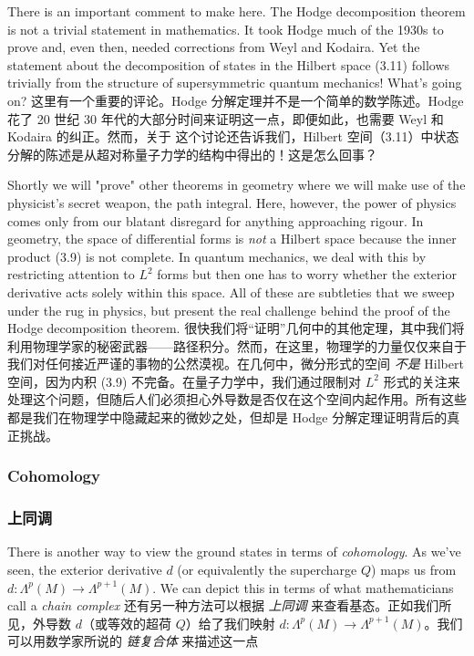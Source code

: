 \documentclass{article}
\begin{document}
\begin{paracol}{2}
There is an important comment to make here. The Hodge decomposition theorem is not a trivial statement in mathematics. It took Hodge much of the 1930s to prove and, even then, needed corrections from Weyl and Kodaira. Yet the statement about the decomposition of states in the Hilbert space (3.11) follows trivially from the structure of supersymmetric quantum mechanics! What’s going on?
\switchcolumn
这里有一个重要的评论。Hodge 分解定理并不是一个简单的数学陈述。Hodge 花了 20 世纪 30 年代的大部分时间来证明这一点，即便如此，也需要 Weyl 和 Kodaira 的纠正。然而，关于 这个讨论还告诉我们，Hilbert 空间（3.11）中状态分解的陈述是从超对称量子力学的结构中得出的！这是怎么回事？
\switchcolumn*

Shortly we will "prove" other theorems in geometry where we will make use of the physicist’s secret weapon, the path integral. Here, however, the power of physics comes only from our blatant disregard for anything approaching rigour. In geometry, the space of differential forms is \textit{not} a Hilbert space because the inner product (3.9) is not complete. In quantum mechanics, we deal with this by restricting attention to $L^2$ forms but then one has to worry whether the exterior derivative acts solely within this space. All of these are subtleties that we sweep under the rug in physics, but present the real challenge behind the proof of the Hodge decomposition theorem.
\switchcolumn
很快我们将“证明”几何中的其他定理，其中我们将利用物理学家的秘密武器——路径积分。然而，在这里，物理学的力量仅仅来自于我们对任何接近严谨的事物的公然漠视。在几何中，微分形式的空间 \textit{不是} Hilbert 空间，因为内积 (3.9) 不完备。在量子力学中，我们通过限制对 $L^2$ 形式的关注来处理这个问题，但随后人们必须担心外导数是否仅在这个空间内起作用。所有这些都是我们在物理学中隐藏起来的微妙之处，但却是 Hodge 分解定理证明背后的真正挑战。
\switchcolumn*

\subsubsection*{Cohomology}
\switchcolumn
\subsubsection*{上同调}
\switchcolumn*

There is another way to view the ground states in terms of \textit{cohomology}. As we’ve seen, the exterior derivative $d$ (or equivalently the supercharge $Q$) maps us from $d: \Lambda^p(M) \to \Lambda^{p + 1}(M)$. We can depict this in terms of what mathematicians call a \textit{chain complex}
\switchcolumn
还有另一种方法可以根据 \textit{上同调} 来查看基态。正如我们所见，外导数 $d$（或等效的超荷 $Q$）给了我们映射 $d: \Lambda^p(M) \to \Lambda^{p + 1}(M)$。我们可以用数学家所说的 \textit{链复合体} 来描述这一点
\end{paracol}
\end{document}
